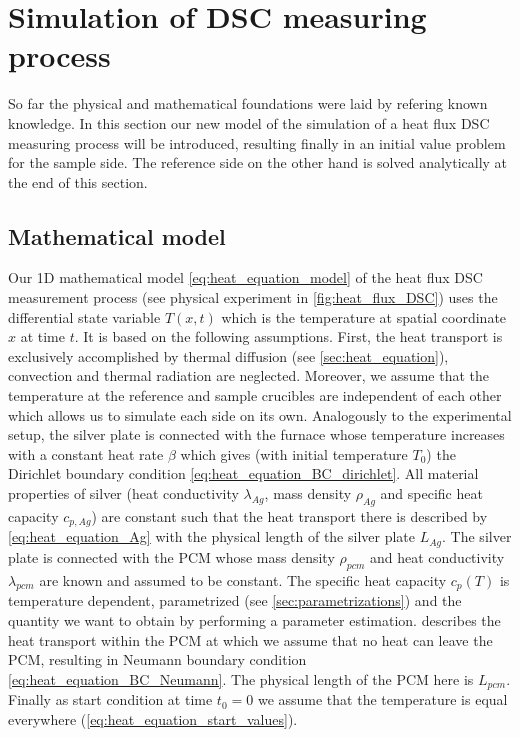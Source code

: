 \documentclass{scrartcl}[12pt, halfparskip]
\numberwithin{equation}{section}
\numberwithin{figure}{section}
\numberwithin{table}{section}
\begin{document}
\newpage
\section{Simulation of DSC measuring process}
\label{sec:simulation_of_DSC}

So far the physical and mathematical foundations were laid by refering known knowledge. In this section our new model of the simulation of a heat flux DSC measuring process will be introduced, resulting finally in an initial value problem for the sample side. The reference side on the other hand is solved analytically at the end of this section.




\subsection{Mathematical model}
\label{sec:mathematical_model}

Our 1D mathematical model \cref{eq:heat_equation_model} of the heat flux DSC measurement process (see physical experiment in \cref{fig:heat_flux_DSC}) uses the differential state variable $T(x,t)$ which is the temperature at spatial coordinate $x$ at time $t$. It is based on the following assumptions. First, the heat transport is exclusively accomplished by thermal diffusion (see \cref{sec:heat_equation}), convection and thermal radiation are neglected. 
Moreover, we assume that the temperature at the reference and sample crucibles are independent of each other which allows us to simulate each side on its own. 
Analogously to the experimental setup, the silver plate is connected with the furnace whose temperature increases with a constant heat rate $\beta$ which gives (with initial temperature $T_0$) the Dirichlet boundary condition \cref{eq:heat_equation_BC_dirichlet}. All material properties of silver (heat conductivity $\lambda_{Ag}$, mass density $\rho_{Ag}$ and specific heat capacity $c_{p,Ag}$) are constant such that the heat transport there is described by \cref{eq:heat_equation_Ag} with the physical length of the silver plate $L_{Ag}$. The silver plate is connected with the PCM whose mass density $\rho_{pcm}$ and heat conductivity $\lambda_{pcm}$ are known and assumed to be constant. The specific heat capacity $c_p(T)$ is temperature dependent, parametrized (see \cref{sec:parametrizations}) and the quantity we want to obtain by performing a parameter estimation.  describes the heat transport within the PCM at which we assume that no heat can leave the PCM, resulting in Neumann boundary condition \cref{eq:heat_equation_BC_Neumann}. The physical length of the PCM here is $L_{pcm}$. Finally as start condition at time ${t_0 = 0}$ we assume that the temperature is equal everywhere (\cref{eq:heat_equation_start_values}). 
\end{document}
